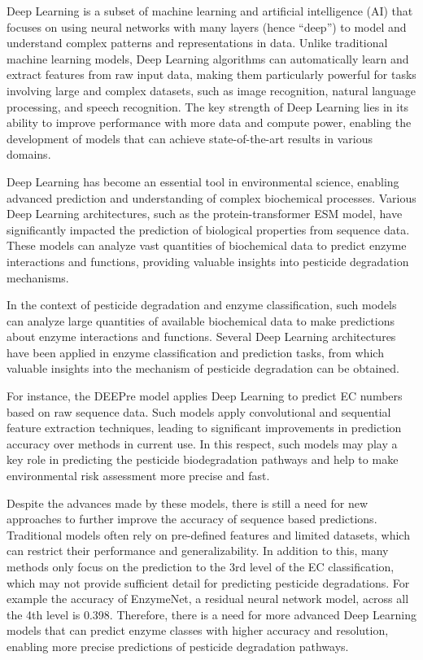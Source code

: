 Deep Learning is a subset of machine learning and artificial intelligence (AI) that focuses on using neural networks with many layers (hence “deep”) to model and understand complex patterns and representations in data. Unlike traditional machine learning models, Deep Learning algorithms can automatically learn and extract features from raw input data, making them particularly powerful for tasks involving large and complex datasets, such as image recognition, natural language processing, and speech recognition. The key strength of Deep Learning lies in its ability to improve performance with more data and compute power, enabling the development of models that can achieve state-of-the-art results in various domains. \autocite{sarkerDeepLearningComprehensive2021}

Deep Learning has become an essential tool in environmental science, enabling advanced prediction and understanding of complex biochemical processes. Various Deep Learning architectures, such as the protein-transformer ESM model, have significantly impacted the prediction of biological properties from sequence data. These models can analyze vast quantities of biochemical data to predict enzyme interactions and functions, providing valuable insights into pesticide degradation mechanisms. \autocite{rivesBiologicalStructureFunction2021}

In the context of pesticide degradation and enzyme classification, such models can analyze large quantities of available biochemical data to make predictions about enzyme interactions and functions. Several Deep Learning architectures have been applied in enzyme classification and prediction tasks, from which valuable insights into the mechanism of pesticide degradation can be obtained.

For instance, the DEEPre model applies Deep Learning to predict EC numbers based on raw sequence data. Such models apply convolutional and sequential feature extraction techniques, leading to significant improvements in prediction accuracy over methods in current use. In this respect, such models may play a key role in predicting the pesticide biodegradation pathways and help to make environmental risk assessment more precise and fast. \autocite{liDEEPreSequencebasedEnzyme2017}

Despite the advances made by these models, there is still a need for new approaches to further improve the accuracy of sequence based predictions. Traditional models often rely on pre-defined features and limited datasets, which can restrict their performance and generalizability. In addition to this, many methods only focus on the prediction to the 3rd level of the EC classification, which may not provide sufficient detail for predicting pesticide degradations. For example the accuracy of EnzymeNet, a residual neural network model, across all the 4th level is 0.398. Therefore, there is a need for more advanced Deep Learning models that can predict enzyme classes with higher accuracy and resolution, enabling more precise predictions of pesticide degradation pathways. \autocite{watanabeEnzymeNetResidualNeural2023}

